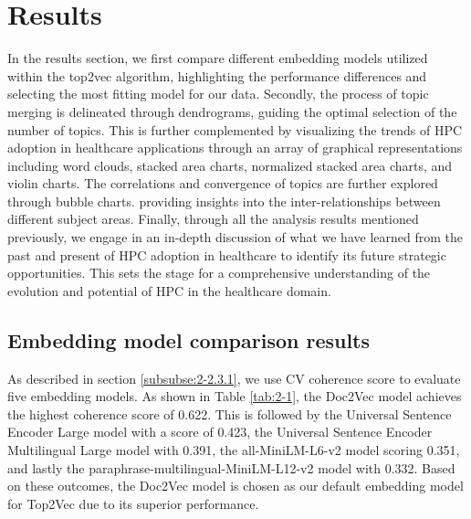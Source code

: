 \section{Results}\label{se:2-3}

In the results section, we first compare different embedding models utilized within the top2vec algorithm, highlighting the performance differences and selecting the most fitting model for our data. Secondly, the process of topic merging is delineated through dendrograms, guiding the optimal selection of the number of topics. This is further complemented by visualizing the trends of HPC adoption in healthcare applications through an array of graphical representations including word clouds, stacked area charts, normalized stacked area charts, and violin charts. The correlations and convergence of topics are further explored through bubble charts. providing insights into the inter-relationships between different subject areas. Finally, through all the analysis results mentioned previously, we engage in an in-depth discussion of what we have learned from the past and present of HPC adoption in healthcare to identify its future strategic opportunities. This sets the stage for a comprehensive understanding of the evolution and potential of HPC in the healthcare domain.



\subsection{Embedding model comparison results}\label{subse:2-3.1}

As described in section \ref{subsubse:2-2.3.1}, we use CV coherence score to evaluate five embedding models. As shown in Table \ref{tab:2-1}, the Doc2Vec model achieves the highest coherence score of 0.622. This is followed by the Universal Sentence Encoder Large model with a score of 0.423, the Universal Sentence Encoder Multilingual Large model with 0.391, the all-MiniLM-L6-v2 model scoring 0.351, and lastly the paraphrase-multilingual-MiniLM-L12-v2 model with 0.332. Based on these outcomes, the Doc2Vec model is chosen as our default embedding model for Top2Vec due to its superior performance.

\begin{table}[!h]
\centering
\caption{Embedding model evaluation results}
\label{tab:2-1}
\end{table}


